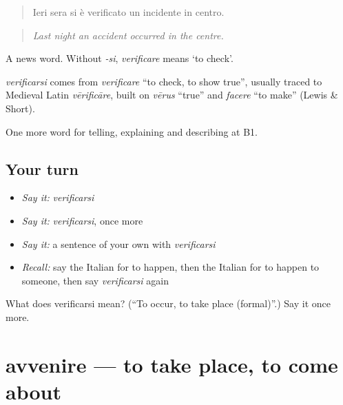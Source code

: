 \begin{quote}
Ieri sera si è verificato un incidente in centro.
\end{quote}

\begin{quote}
\emph{Last night an accident occurred in the centre.}
\end{quote}

A news word. Without \emph{-si}, \emph{verificare} means ‘to check’.

\begin{cousinweb}
\emph{verificarsi} comes from \emph{verificare} \textquotedblleft{}to check, to show true\textquotedblright{}, usually traced to Medieval Latin \emph{vērificāre}, built on \emph{vērus} \textquotedblleft{}true\textquotedblright{} and \emph{facere} \textquotedblleft{}to make\textquotedblright{} (Lewis \& Short).
\end{cousinweb}

\begin{grammarlens}[title={What you've built}]
One more word for telling, explaining and describing at B1.
\end{grammarlens}

\subsection*{Your turn}
\begin{itemize}
\raggedright
  \item \emph{Say it:} \emph{verificarsi}
  \item \emph{Say it:} \emph{verificarsi}, once more
  \item \emph{Say it:} a sentence of your own with \emph{verificarsi}
  \item \emph{Recall:} say the Italian for to happen, then the Italian for to happen to someone, then say \emph{verificarsi} again
\end{itemize}

\begin{tcolorbox}[breakable,colback=teal!4,colframe=teal!35!black,title={Before you move on}]
What does verificarsi mean? (\textquotedblleft{}To occur, to take place (formal)\textquotedblright{}.) Say it once more.
\end{tcolorbox}
\section[avvenire]{avvenire — to take place, to come about}

\label{lesson:IT-C275-avvenire}




